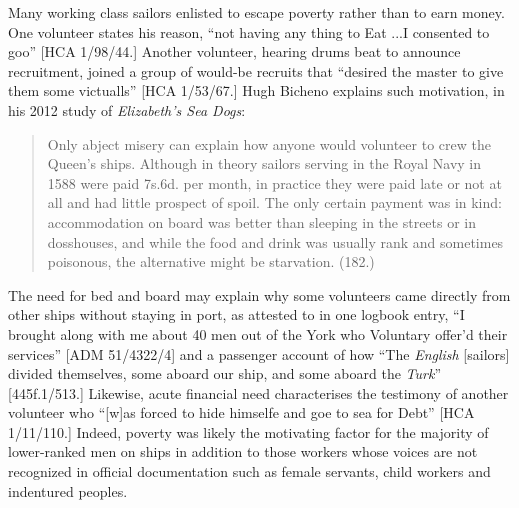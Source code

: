    Many working class sailors enlisted to escape poverty rather than to earn money. One volunteer states his reason, “not having any thing to Eat ...I consented to goo” [HCA 1/98/44.] Another volunteer, hearing drums beat to announce recruitment, joined a group of would-be recruits that “desired the master to give them some victualls” [HCA 1/53/67.] Hugh Bicheno explains such motivation, in his 2012 study of \textit{Elizabeth’s Sea Dogs}:

\begin{quotation}
Only abject misery can explain how anyone would volunteer to crew the Queen’s ships. Although in theory sailors serving in the Royal Navy in 1588 were paid 7s.6d. per month, in practice they were paid late or not at all and had little prospect of spoil. The only certain payment was in kind: accommodation on board was better than sleeping in the streets or in dosshouses, and while the food and drink was usually rank and sometimes poisonous, the alternative might be starvation. (182.)\end{quotation}

The need for bed and board may explain why some volunteers came directly from other ships without staying in port, as attested to in one logbook entry, “I brought along with me about 40 men out of the York who Voluntary offer’d their services” [ADM 51/4322/4] and a passenger account of how “The \textit{English} [sailors] divided themselves, some aboard our ship, and some aboard the \textit{Turk}” [445f.1/513.] Likewise, acute financial need characterises the testimony of another volunteer who “[w]as forced to hide himselfe and goe to sea for Debt” [HCA 1/11/110.] Indeed, poverty was likely the motivating factor for the majority of lower-ranked men on ships in addition to those workers whose voices are not recognized in official documentation such as female servants, child workers and indentured peoples.


